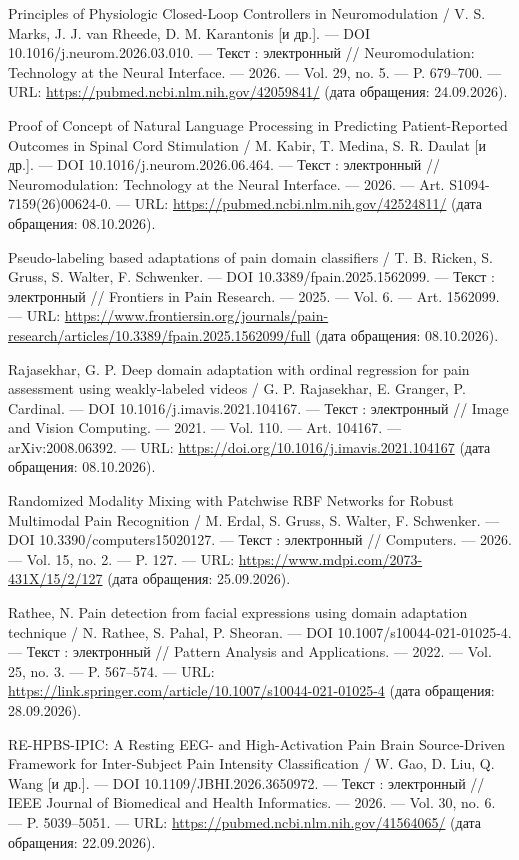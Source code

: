 \begin{list}{}{\setlength{\leftmargin}{10mm}\setlength{\labelwidth}{8mm}\setlength{\labelsep}{2mm}\setlength{\itemsep}{0pt}\setlength{\parsep}{0pt}\setlength{\topsep}{0pt}}
\item[233.] Principles of Physiologic Closed-Loop Controllers in Neuromodulation / V. S. Marks, J. J. van Rheede, D. M. Karantonis [и др.]. — DOI 10.1016/j.neurom.2026.03.010. — Текст : электронный // Neuromodulation: Technology at the Neural Interface. — 2026. — Vol. 29, no. 5. — P. 679–700. — URL: \url{https://pubmed.ncbi.nlm.nih.gov/42059841/} (дата обращения: 24.09.2026).
\item[234.] Proof of Concept of Natural Language Processing in Predicting Patient-Reported Outcomes in Spinal Cord Stimulation / M. Kabir, T. Medina, S. R. Daulat [и др.]. — DOI 10.1016/j.neurom.2026.06.464. — Текст : электронный // Neuromodulation: Technology at the Neural Interface. — 2026. — Art. S1094-7159(26)00624-0. — URL: \url{https://pubmed.ncbi.nlm.nih.gov/42524811/} (дата обращения: 08.10.2026).
\item[235.] Pseudo-labeling based adaptations of pain domain classifiers / T. B. Ricken, S. Gruss, S. Walter, F. Schwenker. — DOI 10.3389/fpain.2025.1562099. — Текст : электронный // Frontiers in Pain Research. — 2025. — Vol. 6. — Art. 1562099. — URL: \url{https://www.frontiersin.org/journals/pain-research/articles/10.3389/fpain.2025.1562099/full} (дата обращения: 08.10.2026).
\item[236.] Rajasekhar, G. P. Deep domain adaptation with ordinal regression for pain assessment using weakly-labeled videos / G. P. Rajasekhar, E. Granger, P. Cardinal. — DOI 10.1016/j.imavis.2021.104167. — Текст : электронный // Image and Vision Computing. — 2021. — Vol. 110. — Art. 104167. — arXiv:2008.06392. — URL: \url{https://doi.org/10.1016/j.imavis.2021.104167} (дата обращения: 08.10.2026).
\item[237.] Randomized Modality Mixing with Patchwise RBF Networks for Robust Multimodal Pain Recognition / M. Erdal, S. Gruss, S. Walter, F. Schwenker. — DOI 10.3390/computers15020127. — Текст : электронный // Computers. — 2026. — Vol. 15, no. 2. — P. 127. — URL: \url{https://www.mdpi.com/2073-431X/15/2/127} (дата обращения: 25.09.2026).
\item[238.] Rathee, N. Pain detection from facial expressions using domain adaptation technique / N. Rathee, S. Pahal, P. Sheoran. — DOI 10.1007/s10044-021-01025-4. — Текст : электронный // Pattern Analysis and Applications. — 2022. — Vol. 25, no. 3. — P. 567–574. — URL: \url{https://link.springer.com/article/10.1007/s10044-021-01025-4} (дата обращения: 28.09.2026).
\item[239.] RE-HPBS-IPIC: A Resting EEG- and High-Activation Pain Brain Source-Driven Framework for Inter-Subject Pain Intensity Classification / W. Gao, D. Liu, Q. Wang [и др.]. — DOI 10.1109/JBHI.2026.3650972. — Текст : электронный // IEEE Journal of Biomedical and Health Informatics. — 2026. — Vol. 30, no. 6. — P. 5039–5051. — URL: \url{https://pubmed.ncbi.nlm.nih.gov/41564065/} (дата обращения: 22.09.2026).

\end{list}
